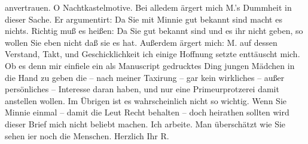 \begin{ledgroupsized}[t]{13cm}
               anvertrauen. O Nachtkastelmotive. Bei alledem ärgert mich M.’s Dummheit in dieser Sache. Er argumentirt: Da Sie mit Minnie gut {\pb}bekannt sind macht es nichts.
               Richtig muß es heißen: Da Sie gut bekannt sind und es ihr nicht geben, so wollen Sie
               eben nicht daß sie es hat. Außerdem ärgert mich: M. auf dessen Verstand, Takt, und Geschicklichkeit ich einige Hoffnung
               setzte enttäuscht mich. Ob es denn mir einfiele ein als Manuscript gedrucktes Ding
               jungen Mädchen in die Hand zu
               geben die – nach meiner Taxirung – gar kein wirkliches – außer persönliches –
               Interesse daran haben, und nur eine Primeurprotzerei damit anstellen wollen. Im
               Übrigen ist es wahrscheinlich nicht so wichtig.\pend
           \pstart
           Wenn Sie Minnie einmal – damit die Leut Recht
               behalten – doch heirathen sollten wird dieser Brief mich nicht beliebt machen.\pend
           \pstart
           Ich arbeite. Man überschätzt wie Sie sehen i{\geminationm}er noch die
               Menschen. Herzlich Ihr \spacefill\mbox{R.}\pend
           
         
         \endnumbering{}\end{ledgroupsized}  \newcommand{\dateiname}{L01053}\newcommand{\titel}{Richard Beer-Hofmann an Arthur Schnitzler, 13. 7. 1900}\newcommand{\editorInnen}{Martin Anton Müller und Gerd-Hermann Susen}
      